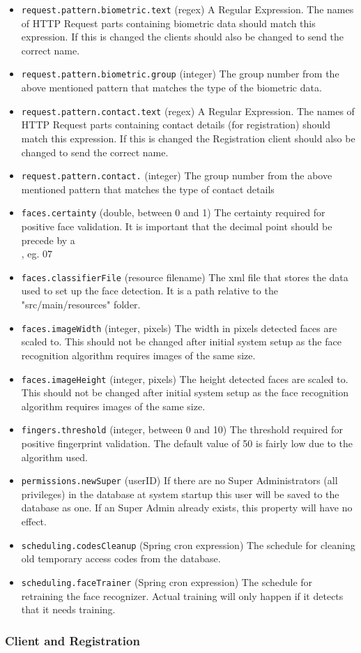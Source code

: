 \begin{itemize}
\item \verb!request.pattern.biometric.text! (regex) A Regular Expression. The names of HTTP Request parts containing biometric data should match this expression. If this is changed the clients should also be changed to send the correct name.
\item \verb!request.pattern.biometric.group! (integer) The group number from the above mentioned pattern that matches the type of the biometric data.
\item \verb!request.pattern.contact.text! (regex) A Regular Expression. The names of HTTP Request parts containing contact details (for registration) should match this expression. If this is changed the Registration client should also be changed to send the correct name.
\item \verb!request.pattern.contact.! (integer) The group number from the above mentioned pattern that matches the type of contact details

\item \verb!faces.certainty! (double, between 0 and 1) The certainty required for positive face validation. It is important that the decimal point should be precede by a \\, eg. 0\.7 
\item \verb!faces.classifierFile! (resource filename) The xml file that stores the data used to set up the face detection. It is a path relative to the "src/main/resources" folder. 
\item \verb!faces.imageWidth! (integer, pixels) The width in pixels detected faces are scaled to. This should not be changed after initial system setup as the face recognition algorithm requires images of the same size.
\item \verb!faces.imageHeight! (integer, pixels) The height detected faces are scaled to. This should not be changed after initial system setup as the face recognition algorithm requires images of the same size.

\item \verb!fingers.threshold! (integer, between 0 and 10) The threshold required for positive fingerprint validation. The default value of 50 is fairly low due to the algorithm used.
\item \verb!permissions.newSuper! (userID) If there are no Super Administrators (all privileges) in the database at system startup this user will be saved to the database as one. If an Super Admin already exists, this property will have no effect. 

\item \verb!scheduling.codesCleanup! (Spring cron expression) The schedule for cleaning old temporary access codes from the database.
\item \verb!scheduling.faceTrainer! (Spring cron expression) The schedule for retraining the face recognizer. Actual training will only happen if it detects that it needs training. 

\end{itemize}
\subsubsection{Client and Registration}

